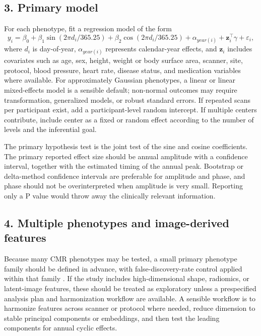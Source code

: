 \subsection*{3. Primary model}

For each phenotype, fit a regression model of the form
\[
 y_i = \beta_0 + \beta_1 \sin\left(2\pi d_i/365.25\right) + \beta_2 \cos\left(2\pi d_i/365.25\right) + \alpha_{year(i)} + \mathbf{z}_i^\top\gamma + \varepsilon_i,
\]
where $d_i$ is day-of-year, $\alpha_{year(i)}$ represents calendar-year effects, and $\mathbf{z}_i$ includes covariates such as age, sex, height, weight or body surface area, scanner, site, protocol, blood pressure, heart rate, disease status, and medication variables where available. For approximately Gaussian phenotypes, a linear or linear mixed-effects model is a sensible default; non-normal outcomes may require transformation, generalized models, or robust standard errors. If repeated scans per participant exist, add a participant-level random intercept. If multiple centers contribute, include center as a fixed or random effect according to the number of levels and the inferential goal.

The primary hypothesis test is the joint test of the sine and cosine coefficients. The primary reported effect size should be annual amplitude with a confidence interval, together with the estimated timing of the annual peak. Bootstrap or delta-method confidence intervals are preferable for amplitude and phase, and phase should not be overinterpreted when amplitude is very small. Reporting only a P value would throw away the clinically relevant information.

\subsection*{4. Multiple phenotypes and image-derived features}

Because many CMR phenotypes may be tested, a small primary phenotype family should be defined in advance, with false-discovery-rate control applied within that family \cite{Benjamini1995}. If the study includes high-dimensional shape, radiomics, or latent-image features, these should be treated as exploratory unless a prespecified analysis plan and harmonization workflow are available. A sensible workflow is to harmonize features across scanner or protocol where needed, reduce dimension to stable principal components or embeddings, and then test the leading components for annual cyclic effects.

